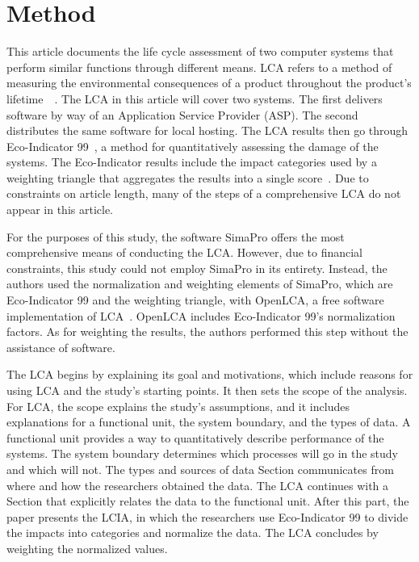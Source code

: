 \documentclass[final,journal,10pt,letterpaper,oneside,twocolumn,compsoc]%
{IEEEtran}
\begin{document}
\section{Method}
This article documents the life cycle assessment of two computer systems
that perform similar functions through different means. LCA refers to a method
of measuring the environmental consequences of a product throughout the
product's
lifetime~\cite{14040}~\cite{14044}. The LCA in this article will cover two
systems. The first
delivers software by way of an Application Service Provider (ASP). The
second distributes the same software for local hosting. The LCA results then go
through Eco-Indicator 99~\cite{pre}, a method for quantitatively assessing the
damage of the systems. The Eco-Indicator
results include the impact categories used by a weighting triangle that
aggregates the results into a single score~\cite{triangle}. Due to constraints
on article length, many of the steps of a comprehensive LCA do not appear in
this article.

For the purposes of this study, the software SimaPro offers the most
comprehensive means of conducting the LCA.
However, due to financial constraints, this study could not employ SimaPro in
its entirety. Instead,
the authors used the normalization and weighting elements of SimaPro, which are
Eco-Indicator 99
and the weighting triangle, with OpenLCA, a free software implementation of LCA~\cite{openlca}. OpenLCA includes Eco-Indicator 99's normalization factors. As
for weighting the results, the
authors performed this step without the assistance of software.

The LCA begins by explaining its goal and motivations, which include reasons for
using LCA and the study's starting points. It then sets the scope of
the analysis. For LCA, the scope explains the study's assumptions, and it
includes explanations for a functional unit,
the system boundary, and the types of data. A functional unit provides a way to
quantitatively describe performance of the systems. The system boundary
determines which processes will go in the study and which will not. The types
and sources of data Section communicates from where and how the researchers
obtained the data. The LCA continues with a Section that explicitly relates the
data to the functional unit. After this part, the paper presents the LCIA, in
which the researchers use Eco-Indicator 99 to divide the impacts into categories
and normalize the data. The LCA concludes by weighting the normalized values.
\end{document}
